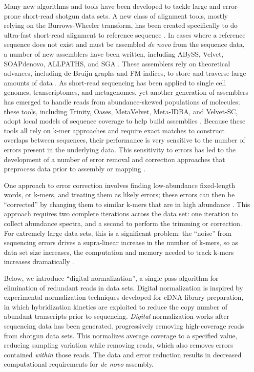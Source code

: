 \documentclass{pnastwo}
\begin{document}
\begin{article}
Many new algorithms and tools have been developed to tackle large and
error-prone short-read shotgun data sets. A new class of alignment
tools, mostly relying on the Burrows-Wheeler transform, has been
created specifically to do ultra-fast short-read alignment to
reference sequence \cite{pubmed19430453}.  In cases where a reference
sequence does not exist and must be assembled {\em de novo} from the
sequence data, a number of new assemblers have been written, including
ABySS, Velvet, SOAPdenovo, ALLPATHS, and SGA
\cite{pubmed19251739,pubmed18349386,pubmed20511140,pubmed21187386,pubmed22156294}.  These assemblers
rely on theoretical advances, including de Bruijn graphs and
FM-indices, to store and traverse large amounts of data
\cite{pubmed22068540,pubmed20529929}.  As short-read sequencing has
been applied to single cell genomes, transcriptomes, and metagenomes,
yet another generation of assemblers has emerged to handle reads from
abundance-skewed populations of molecules; these tools, including
Trinity, Oases, MetaVelvet, Meta-IDBA, and Velvet-SC, adopt local
models of sequence coverage to help build assemblies
\cite{pubmed21572440,pubmed22368243,metavelvet,pubmed21685107,pubmed21926975}.
Because these tools all rely on k-mer approaches and require exact
matches to construct overlaps between sequences, their performance is
very sensitive to the number of errors present in the underlying data.
This sensitivity to errors has led to the development of a number of
error removal and correction approaches that preprocess data prior to
assembly or mapping
\cite{pubmed21685062,pubmed15059830,pubmed21114842}.

One approach to error correction involves finding low-abundance
fixed-length words, or k-mers, and treating them as likely errors;
these errors can then be ``corrected'' by changing them to similar
k-mers that are in high abundance \cite{pubmed21114842}.  This
approach requires two complete iterations across the data set: one
iteration to collect abundance spectra, and a second to perform the
trimming or correction.  For extremely large data sets, this is a
significant problem: the ``noise'' from sequencing errors drives a
supra-linear increase in the number of k-mers, so as data set size
increases, the computation and memory needed to track k-mers increases
dramatically \cite{pubmed21245053}.


Below, we introduce ``digital normalization'', a single-pass algorithm
for elimination of redundant reads in data sets.  Digital
normalization is inspired by experimental normalization techniques
developed for cDNA library preparation, in which hybridization
kinetics are exploited to reduce the copy number of abundant
transcripts prior to sequencing\cite{pubmed8889548,pubmed7937745}.
{\em Digital} normalization works after sequencing data has been
generated, progressively removing high-coverage reads from shotgun
data sets.  This normalizes average coverage to a specified value,
reducing sampling variation while removing reads, which also removes
errors contained {\em within} those reads.  The data and error
reduction results in decreased computational requirements for {\em de
  novo} assembly.


\end{article}
\end{document}
